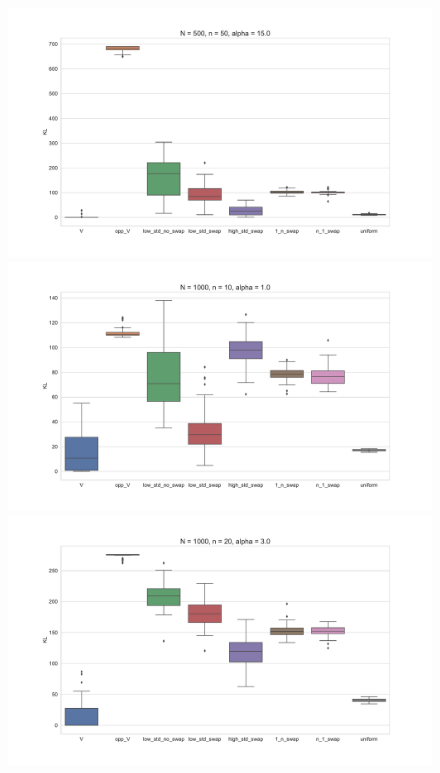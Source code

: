 \documentclass[11pt, oneside]{article}   	%
\begin{document}
\begin{figure}[h!]
\begin{minipage}[t]{.23\textwidth}
	\end{minipage}
	\hfill
	\begin{minipage}[t]{.23\textwidth}
		\centering
		\includegraphics[width=\textwidth]{figures/theorem2_2/N500n50alpha15.pdf}
		
	\end{minipage} 

	
	\begin{minipage}[t]{.23\textwidth}
		\centering
		\includegraphics[width=\textwidth]{figures/theorem2_2/N1000n10alpha1.pdf}
		
	\end{minipage}
	\hfill
	\begin{minipage}[t]{.23\textwidth}
		\centering
		\includegraphics[width=\textwidth]{figures/theorem2_2/N1000n20alpha3.pdf}
		

\end{minipage}
\end{figure}
\end{document}
